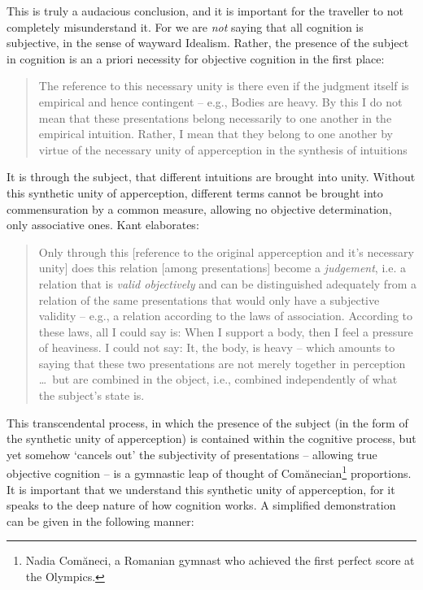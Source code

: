 This is truly a audacious conclusion, and it is important for the traveller to not completely misunderstand it. For we are \emph{not} saying that all cognition is subjective, in the sense of wayward Idealism. Rather, the presence of the subject in cognition is an a priori necessity for objective cognition in the first place:

\begin{quote}
  The reference to this necessary unity is there even if the judgment itself is empirical and hence contingent -- e.g., Bodies are heavy. By this I do not mean that these presentations belong necessarily to one another in the empirical intuition. Rather, I mean that they belong to one another by virtue of the necessary unity of apperception in the synthesis of intuitions

  \autocite[B142]{hackett}
\end{quote}

\noindent
It is through the subject, that different intuitions are brought into unity. Without this synthetic unity of apperception, different terms cannot be brought into commensuration by a common measure, allowing no objective determination, only associative ones. Kant elaborates:

\begin{quote}
  Only through this [reference to the original apperception and it's necessary unity] does this relation [among presentations] become a \emph{judgement}, i.e. a relation that is \emph{valid objectively} and can be distinguished adequately from a relation of the same presentations that would only have a subjective validity -- e.g., a relation according to the laws of association. According to these laws, all I could say is: When I support a body, then I feel a pressure of heaviness. I could not say: It, the body, is heavy -- which amounts to saying that these two presentations are not merely together in perception \ldots\ but are combined in the object, i.e., combined independently of what the subject's state is.

  \autocite[B143]{hackett}
\end{quote}

This transcendental process, in which the presence of the subject (in the form of the synthetic unity of apperception) is contained within the cognitive process, but yet somehow `cancels out' the subjectivity of presentations -- allowing true objective cognition -- is a gymnastic leap of thought of Comănecian\footnote{Nadia Comăneci, a Romanian gymnast who achieved the first perfect score at the Olympics.} proportions. It is important that we understand this synthetic unity of apperception, for it speaks to the deep nature of how cognition works. A simplified demonstration can be given in the following manner:

